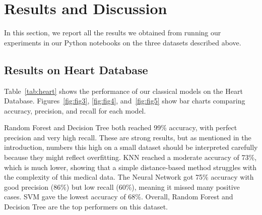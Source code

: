 \documentclass[10pt, twocolumn]{article}
\begin{document}
\section{Results and Discussion}

In this section, we report all the results we obtained from running our experiments
in our Python notebooks on the three datasets described above.

\subsection{Results on Heart Database}

Table~\ref{tab:heart} shows the performance of our classical models on the Heart Database.
Figures~\ref{fig:fig3}, \ref{fig:fig4}, and~\ref{fig:fig5} show bar charts comparing
accuracy, precision, and recall for each model.

\begin{table}[H]
\centering
\caption{Results of our Models on Heart Database.}
\label{tab:heart}
\end{table}

Random Forest and Decision Tree both reached 99\% accuracy, with perfect precision and
very high recall. These are strong results, but as mentioned in the introduction, numbers
this high on a small dataset should be interpreted carefully because they might reflect
overfitting. KNN reached a moderate accuracy of 73\%, which is much lower, showing that
a simple distance-based method struggles with the complexity of this medical data.
The Neural Network got 75\% accuracy with good precision (86\%) but low recall (60\%),
meaning it missed many positive cases. SVM gave the lowest accuracy of 68\%.
Overall, Random Forest and Decision Tree are the top performers on this dataset.
\end{document}
